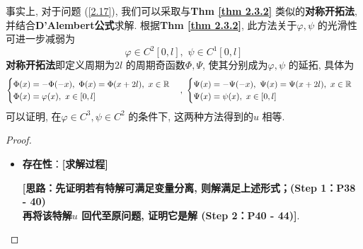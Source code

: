 \begin{thm}
		\begin{rmk}
			事实上, 对于问题 (\ref{2.17}), 我们可以采取与\textbf{Thm \ref{thm 2.3.2}} 类似的\textbf{对称开拓法}, 并结合\textbf{D'Alembert公式}求解. 根据\textbf{Thm \ref{thm 2.3.2}}, 此方法关于$\varphi , \psi$ 的光滑性可进一步减弱为
			\[ \varphi \in C^2[0 , l] , \,\, \psi \in C^1[0 , l] \]
			\textbf{对称开拓法}即定义周期为$2l$ 的周期奇函数$\Phi , \Psi$, 使其分别成为$\varphi , \psi$ 的延拓, 具体为
			\begin{align*}
				\begin{cases}
					\Phi(x) = -\Phi(-x) , \,\, \Phi(x) = \Phi(x + 2l) , \,\, x \in \mathbb{R} \\
					\Phi(x) = \varphi(x) , \,\, x \in [0 , l]
				\end{cases} , \,\, 
				\begin{cases}
					\Psi(x) = -\Psi(-x) , \,\, \Psi(x) = \Psi(x + 2l) , \,\, x \in \mathbb{R} \\
					\Psi(x) = \psi(x) , \,\, x \in [0 , l]
				\end{cases}
			\end{align*}
			可以证明, 在$\varphi \in C^3 , \psi \in C^2$ 的条件下, 这两种方法得到的$u$ 相等. 
		\end{rmk}
		
		\newpage
		
		\begin{proof}
			\begin{itemize}
				\item \textbf{存在性}：\textbf{[求解过程]}
				\begin{center}
					\textbf{[思路：先证明若有特解可满足变量分离, 则解满足上述形式；(Step 1：P38 - 40)\\
						再将该特解$u$ 回代至原问题, 证明它是解 (Step 2：P40 - 44)]}. 
				\end{center}
				

\end{itemize}
\end{proof}
\end{thm}
